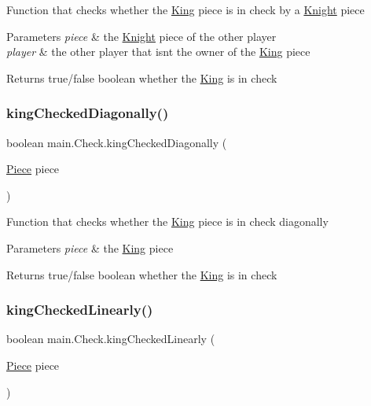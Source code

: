 Function that checks whether the \hyperlink{classmain_1_1_king}{King} piece is in check by a \hyperlink{classmain_1_1_knight}{Knight} piece 
\begin{DoxyParams}{Parameters}
{\em piece} & the \hyperlink{classmain_1_1_knight}{Knight} piece of the other player \\
\hline
{\em player} & the other player that isn\textquotesingle{}t the owner of the \hyperlink{classmain_1_1_king}{King} piece \\
\hline
\end{DoxyParams}
\begin{DoxyReturn}{Returns}
true/false boolean whether the \hyperlink{classmain_1_1_king}{King} is in check 
\end{DoxyReturn}
\mbox{\label{classmain_1_1_check_af22afdde9a99d951237d65b8a9d32535}} 
\subsubsection{\texorpdfstring{king\+Checked\+Diagonally()}{kingCheckedDiagonally()}}
{\footnotesize\ttfamily boolean main.\+Check.\+king\+Checked\+Diagonally (\begin{DoxyParamCaption}\item[{\hyperlink{classmain_1_1_piece}{Piece}}]{piece }\end{DoxyParamCaption})}

Function that checks whether the \hyperlink{classmain_1_1_king}{King} piece is in check diagonally 
\begin{DoxyParams}{Parameters}
{\em piece} & the \hyperlink{classmain_1_1_king}{King} piece \\
\hline
\end{DoxyParams}
\begin{DoxyReturn}{Returns}
true/false boolean whether the \hyperlink{classmain_1_1_king}{King} is in check 
\end{DoxyReturn}
\mbox{\label{classmain_1_1_check_a5230cdb389e62d0afbff4b05af28aff0}} 
\subsubsection{\texorpdfstring{king\+Checked\+Linearly()}{kingCheckedLinearly()}}
{\footnotesize\ttfamily boolean main.\+Check.\+king\+Checked\+Linearly (\begin{DoxyParamCaption}\item[{\hyperlink{classmain_1_1_piece}{Piece}}]{piece }\end{DoxyParamCaption})}


